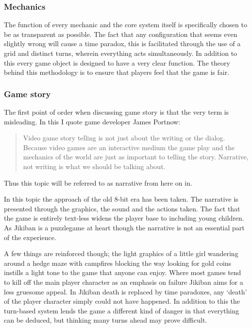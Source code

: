 \subsubsection{Mechanics}
The function of every mechanic and the core system itself is
specifically chosen to be as transparent as possible. The fact that
any configuration that seems even slightly wrong will cause a time
paradox, this is facilitated through the use of a grid and distinct
turns, wherein everything acts simultaneously. In addition to this
every game object is designed to have a very clear function. The
theory behind this methodology is to ensure that players feel that the
game is fair.

\subsubsection{Game story}
The first point of order when discussing game story is that the very
term is misleading. In this I quote game developer James Portnow\cite{portnow2}:

\begin{quotation}
Video game story telling is not just about the writing or the
dialog. Because video games are an interactive medium the game play
and the mechanics of the world are just as important to telling the
story. Narrative, not writing is what we should be talking about.
\end{quotation}

Thus this topic will be referred to as narrative from here on in.

In this topic the approach of the old 8-bit era has been taken. The
narrative is presented through the graphics, the sound and the actions
taken. The fact that the game is entirely text-less widens the player
base to including young children. As Jikiban is a puzzlegame at heart
though the narrative is not an essential part of the experience.

A few things are reinforced though; the light graphics of a little
girl wandering around a hedge maze with campfires blocking the way
looking for gold coins instills a light tone to the game that anyone
can enjoy.  Where most games tend to kill off the main player
character as an emphasis on failure Jikiban aims for a less gruesome
appeal. In Jikiban death is replaced by time paradoxes, any ‘death’ of
the player character simply could not have happened. In addition to
this the turn-based system lends the game a different kind of danger
in that everything can be deduced, but thinking many turns ahead may
prove difficult.

